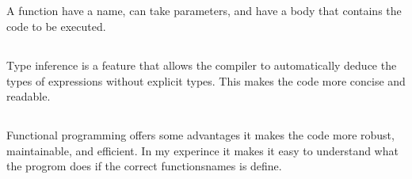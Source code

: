 \documentclass{article}
\begin{document}
\subsection{}

A function have a name, can take parameters, and have a body that contains the code to be executed.

\subsection{}
Type inference is a feature that allows the compiler to automatically deduce the types of expressions without explicit types. This makes the code more concise and readable. 

\subsection{}

Functional programming offers some advantages it makes the code more robust, maintainable, and efficient. In my experince it makes it easy to understand what the progrom does if the correct functionsnames is define.
\end{document}
